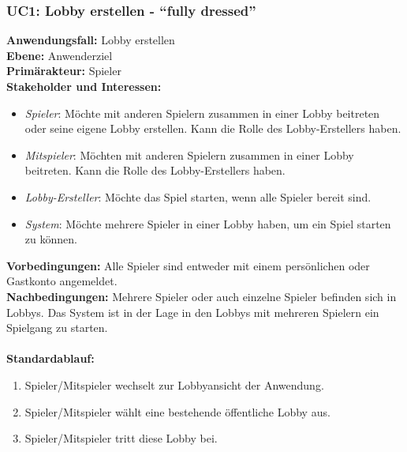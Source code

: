 \documentclass[11pt,ngerman]{article}
\newcommand{\quotes}[1]{``#1''}
\begin{document}
        \subsubsection{UC1: Lobby erstellen - \quotes{fully dressed}}
            \begin{tcolorbox}[enhanced, breakable, sharp corners, width=\dimexpr\textwidth-15mm\relax ,enlarge left by=10mm ,fontupper=\linespread{1.1}\selectfont, boxrule=1pt, title={UC1: Lobby erstellen}, colback=white, colframe=gray!22, coltitle=black]

                \textbf{Anwendungsfall:} Lobby erstellen \\
                \textbf{Ebene:} Anwenderziel \\
                \textbf{Primärakteur:} Spieler \\
                \textbf{Stakeholder und Interessen:}
                \begin{itemize}
                    \item \textit{Spieler}: Möchte mit anderen Spielern zusammen in einer Lobby beitreten oder seine eigene Lobby erstellen. Kann die Rolle des Lobby-Erstellers haben.
                    \item \textit{Mitspieler}: Möchten mit anderen Spielern zusammen in einer Lobby beitreten. Kann die Rolle des Lobby-Erstellers haben.
                    \item \textit{Lobby-Ersteller}:  Möchte das Spiel starten, wenn alle Spieler bereit sind.
                    \item \textit{System}: Möchte mehrere Spieler in einer Lobby haben, um ein Spiel starten zu können.
                \end{itemize}
                \textbf{Vorbedingungen:} Alle Spieler sind entweder mit einem persönlichen oder Gastkonto angemeldet.\\
                \textbf{Nachbedingungen:} Mehrere Spieler oder auch einzelne Spieler befinden sich in Lobbys. Das System ist in der Lage in den Lobbys mit mehreren Spielern ein Spielgang zu starten. \\
               \\  \textbf{Standardablauf:}
                \begin{enumerate}
                    \item Spieler/Mitspieler wechselt zur Lobbyansicht der Anwendung.
                    \item Spieler/Mitspieler wählt eine bestehende öffentliche Lobby aus.
                    \item Spieler/Mitspieler tritt diese Lobby bei.

\end{enumerate}
\end{tcolorbox}
\end{document}
